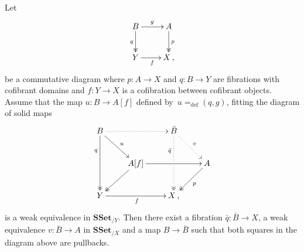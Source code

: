 \documentclass[reqno,10pt,a4paper,oneside]{amsart}
\numberwithin{equation}{section}
\theoremstyle{mythm}
\theoremstyle{mydef}
\theoremstyle{myrmk}
\newcommand{\defeq}{=_{\operatorname{def}}}
\newcommand{\co}{\colon}
\newcommand{\SSet}{\mathbf{SSet}}
\begin{document}
\begin{proposition}
\label{Prop:Homotopy_ext_prop}
Let 
\[
\xymatrix{
B \ar[r]^g \ar@{->>}[d]_q & A \ar@{->>}[d]^p \\
Y \ar[r]_f & X \, ,}
\]
be a commutative diagram where $p \co A \to X$ and $q \co B \to Y$ are fibrations with cofibrant domains and $f \co Y \to X$ is
a cofibration between cofibrant objects. Assume that the map $u \co B \to A[f]$ defined by~$u \defeq (q, g)$, fitting the diagram 
of solid maps
\[ 
\xymatrix{
 B
  \ar@{.>}[rr]
  \ar[dr]^{u}
  \ar@{->>}[dd]_(.3){q}
&&
  \bar{B}
  \ar@{.>}[dr]^{v}
  \ar@{.>>}[dd]_(.3){\bar{q}}|{\hole}
&\\&
  A[f] 
  \ar[rr]
  \ar@{->>}[dl]
&&
  A
  \ar@{->>}[dl]^{p}
\\
  Y
  \ar[rr]_{f}
&&
  X \, ,
&
}
\]
is a weak equivalence in $\SSet_{/ Y}$. Then there exist a fibration $\bar{q} \co \bar{B} \to X$, a weak equivalence $v \co \bar{B} \to A$ in $\SSet_{/X}$ and a map $B \to \bar{B}$ such that both squares in the diagram above are pullbacks. 
\end{proposition}
\end{document}
